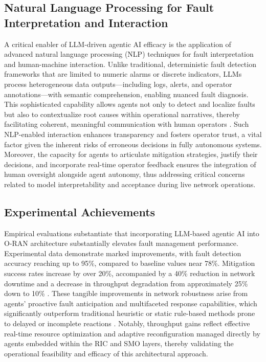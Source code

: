 \subsection{Natural Language Processing for Fault Interpretation and Interaction}

A critical enabler of LLM-driven agentic AI efficacy is the application of advanced natural language processing (NLP) techniques for fault interpretation and human-machine interaction. Unlike traditional, deterministic fault detection frameworks that are limited to numeric alarms or discrete indicators, LLMs process heterogeneous data outputs---including logs, alerts, and operator annotations---with semantic comprehension, enabling nuanced fault diagnosis. This sophisticated capability allows agents not only to detect and localize faults but also to contextualize root causes within operational narratives, thereby facilitating coherent, meaningful communication with human operators \cite{ref55}. Such NLP-enabled interaction enhances transparency and fosters operator trust, a vital factor given the inherent risks of erroneous decisions in fully autonomous systems. Moreover, the capacity for agents to articulate mitigation strategies, justify their decisions, and incorporate real-time operator feedback ensures the integration of human oversight alongside agent autonomy, thus addressing critical concerns related to model interpretability and acceptance during live network operations.

\subsection{Experimental Achievements}

Empirical evaluations substantiate that incorporating LLM-based agentic AI into O-RAN architecture substantially elevates fault management performance. Experimental data demonstrate marked improvements, with fault detection accuracy reaching up to 95\%, compared to baseline values near 78\%. Mitigation success rates increase by over 20\%, accompanied by a 40\% reduction in network downtime and a decrease in throughput degradation from approximately 25\% down to 10\% \cite{ref46,ref55,ref27}. These tangible improvements in network robustness arise from agents' proactive fault anticipation and multifaceted response capabilities, which significantly outperform traditional heuristic or static rule-based methods prone to delayed or incomplete reactions \cite{ref27}. Notably, throughput gains reflect effective real-time resource optimization and adaptive reconfiguration managed directly by agents embedded within the RIC and SMO layers, thereby validating the operational feasibility and efficacy of this architectural approach.

